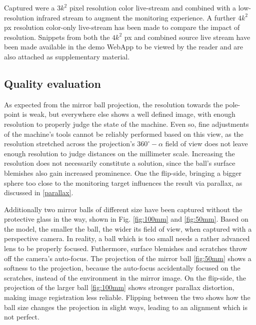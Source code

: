 \documentclass[10pt]{article}
\begin{document}
\begin{multicols}{2}
	Captured were a $3k^2$ pixel resolution color live-stream and combined with a low-resolution infrared stream to augment the monitoring experience. A further $4k^2$ px resolution color-only live-stream has been made to compare the impact of resolution. Snippets from both the $4k^2$ px and combined source live stream have been made available in the demo WebApp to be viewed by the reader and are also attached as supplementary material.

	\subsection{Quality evaluation}
	As expected from the mirror ball projection, the resolution towards the pole-point is weak, but everywhere else shows a well defined image, with enough resolution to properly judge the state of the machine. Even so, fine adjustments of the machine's tools cannot be reliably performed based on this view, as the resolution stretched across the projection's $360^{\circ}-\alpha$ field of view does not leave enough resolution to judge distances on the millimeter scale. Increasing the resolution does not necessarily constitute a solution, since the ball's surface blemishes also gain increased prominence. One the flip-side, bringing a bigger sphere too close to the monitoring target influences the result via parallax, as discussed in \ref{parallax}.
	
	Additionally two mirror balls of different size have been captured without the protective glass in the way, shown in Fig. \ref{fig:100mm} and \ref{fig:50mm}. Based on the model, the smaller the ball, the wider its field of view, when captured with a perspective camera. In reality, a ball which is too small needs a rather advanced lens to be properly focused. Futhermore, surface blemishes and scratches throw off the camera's auto-focus. The projection of the mirror ball \ref{fig:50mm} shows a softness to the projection, because the auto-focus accidentally focused on the scratches, instead of the environment in the  mirror image. On the flip-side, the projection of the larger ball \ref{fig:100mm} shows stronger parallax distortion, making image registration less reliable. Flipping between the two shows how the ball size changes the projection in slight ways, leading to an alignment which is not perfect.


\end{multicols}
\end{document}
